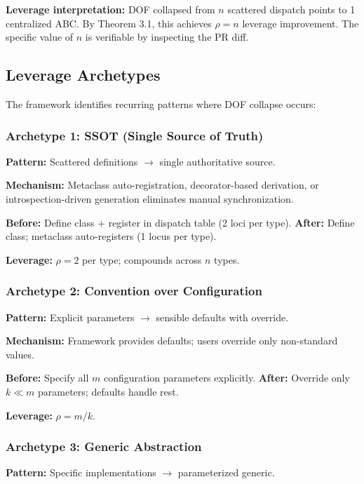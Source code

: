 \textbf{Leverage interpretation:} DOF collapsed from $n$ scattered
dispatch points to 1 centralized ABC. By Theorem 3.1, this achieves
$\rho = n$ leverage improvement. The specific value of $n$ is
verifiable by inspecting the PR diff.

\subsection{Leverage Archetypes}

The framework identifies recurring patterns where DOF collapse occurs:

\subsubsection{Archetype 1: SSOT (Single Source of Truth)}

\textbf{Pattern:} Scattered definitions $\to$ single authoritative source.

\textbf{Mechanism:} Metaclass auto-registration, decorator-based derivation,
or introspection-driven generation eliminates manual synchronization.

\textbf{Before:} Define class + register in dispatch table (2 loci per type).
\textbf{After:} Define class; metaclass auto-registers (1 locus per type).

\textbf{Leverage:} $\rho = 2$ per type; compounds across $n$ types.

\subsubsection{Archetype 2: Convention over Configuration}

\textbf{Pattern:} Explicit parameters $\to$ sensible defaults with override.

\textbf{Mechanism:} Framework provides defaults; users override only
non-standard values.

\textbf{Before:} Specify all $m$ configuration parameters explicitly.
\textbf{After:} Override only $k \ll m$ parameters; defaults handle rest.

\textbf{Leverage:} $\rho = m/k$.

\subsubsection{Archetype 3: Generic Abstraction}

\textbf{Pattern:} Specific implementations $\to$ parameterized generic.

